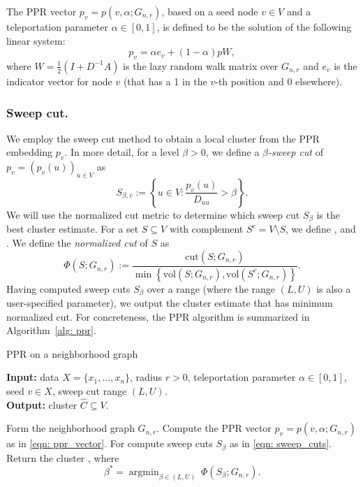 \documentclass{article}
\newcommand{\set}[1]{\left\{#1\right\}}
\newcommand{\vol}{\mathrm{vol}}
\newcommand{\1}{\mathbf{1}}
\DeclareMathOperator*{\argmin}{argmin}
\newcommand{\cut}{\textrm{cut}}
\theoremstyle{alden}
\theoremstyle{aldenthm}
\theoremstyle{definition}
\theoremstyle{remark}
\begin{document}
The PPR vector $p_v = p(v,\alpha;G_{n,r})$, based on
a seed node $v \in V$ and a teleportation parameter $\alpha \in [0,1]$, is defined to be 
the solution of the following linear system:
\begin{equation}
\label{eqn: ppr_vector}
p_v = \alpha e_{v} + (1 - \alpha) p W,
\end{equation}
where $W = \frac{1}{2}(I + D^{-1}A)$ is the lazy random walk matrix over
$G_{n,r}$ and $e_{v}$ is the indicator vector for node $v$ (that has a 1 in the
$v$-th position and 0 elsewhere).

\subsubsection{Sweep cut.}

We employ the sweep cut method to obtain a local cluster from the PPR embedding $p_v$. In more detail, for a level $\beta > 0$, we define a \emph{$\beta$-sweep cut} of $p_v = (p_v(u))_{u \in V}$
as   
\begin{equation}
\label{eqn: sweep_cuts}
S_{\beta,v} := \set{u \in V: \frac{p_v(u)}{D_{uu}} > \beta}.
\end{equation}
We will use the normalized cut metric to determine which sweep cut $S_{\beta}$
is the best cluster estimate. For a set $S \subseteq V$ with complement $S^c = V
\setminus S$, we define \smash{$\cut(S;G_{n,r}) := \sum_{u \in S, v \in S^c}
	A_{uv}$}, and \smash{$\vol(S; G_{n,r}) := \sum_{u \in S} D_{uu}$}.  We
define the \emph{normalized cut} of $S$ as
\begin{equation}
\label{eqn: normalized_cut}
\Phi(S; G_{n,r}) := \frac{\cut(S;G_{n,r})}{\min \set{\vol(S; G_{n,r}), \vol(S^c; G_{n,r})}}.
\end{equation}
Having computed sweep cuts $S_{\beta}$ over a range  (where the range $(L,U)$ is also a user-specified parameter), we output the cluster estimate
 that has minimum normalized cut.
For concreteness, the PPR algorithm is summarized in Algorithm~\ref{alg: ppr}. 

\begin{algorithm}
	\caption{PPR on a neighborhood graph}
	\label{alg: ppr}	
	{\bfseries Input:} data $X=\{x_1,\ldots,x_n\}$, radius $r > 0$, teleportation
	parameter $\alpha \in [0,1]$, seed $v \in X$, sweep cut range $(L,U)$. \\     
	{\bfseries Output:} cluster $\widehat{C} \subseteq V$.
	\begin{algorithmic}[1]
		\STATE Form the neighborhood graph $G_{n,r}$.
		\STATE Compute the PPR vector $p_v=p(v, \alpha; G_{n,r})$ as in \eqref{eqn: 
			ppr_vector}. 
		\STATE For  compute sweep cuts 
		$S_{\beta}$ as in \eqref{eqn: sweep_cuts}.
		\STATE Return the cluster , where  
		$$
		\beta^* = \argmin_{\beta \in (L,U)}~ \Phi(S_{\beta}; G_{n,r}).
		$$
	\end{algorithmic}
\end{algorithm}
\end{document}

